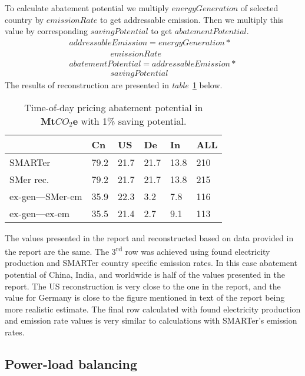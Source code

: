 \documentclass[11pt, twocolumn]{article}
\newcommand{\ts}{\textsuperscript}
\begin{document}
To calculate abatement potential we multiply $energyGeneration$ of selected country by $emissionRate$ to get addressable emission. Then we multiply this value by corresponding $savingPotential$ to get $abatementPotential$.
\begin{gather*}
  addressableEmission = energyGeneration *\\
  \quad\quad\quad\quad\quad emissionRate\\
  abatementPotential = addressableEmission *\\
  \quad\quad\quad\quad\quad savingPotential
\end{gather*}
The results of reconstruction are presented in \emph{table}~\ref{tab:todp} below.
\begin{center}
  \begin{table}[h]
    \begin{tabular}{ p{} | p{} | p{} | p{} | p{} | p{} }
       & Cn & US & De & In & ALL \\
      \hline
      SMARTer & 79.2 & 21.7 & 21.7 & 13.8 & 210 \\
      SMer rec. & 79.2 & 21.7 & 21.7 & 13.8 & 215 \\
      ex-gen---SMer-em & 35.9 & 22.3 & 3.2 & 7.8 & 116 \\
      ex-gen---ex-em & 35.5 & 21.4 & 2.7 & 9.1 & 113
    \end{tabular}
    \caption{Time-of-day pricing abatement potential in $\mathbf{Mt}CO_2\mathbf{e}$ with 1\% saving potential. \label{tab:todp}}
  \end{table}
\end{center}

The values presented in the report and reconstructed based on data provided in the report are the same. The 3\ts{rd} row was achieved using found electricity production and SMARTer country specific emission rates. In this case abatement potential of China, India, and worldwide is half of the values presented in the report. The US reconstruction is very close to the one in the report, and the value for Germany is close to the figure mentioned in text of the report being more realistic estimate. The final row calculated with found electricity production and emission rate values is very similar to calculations with SMARTer's emission rates.



\subsection{Power-load balancing}
\end{document}
